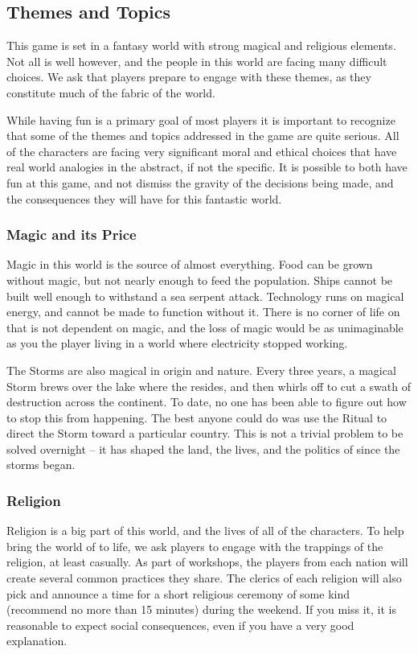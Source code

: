 \documentclass[sheet]{GL2020}
\begin{document}
\subsection{Themes and Topics}
This game is set in a fantasy world with strong magical and religious elements. Not all is well however, and the people in this world are facing many difficult choices. We ask that players prepare to engage with these themes, as they constitute much of the fabric of the world.

While having fun is a primary goal of most players it is important to recognize that some of the themes and topics addressed in the game are quite serious. All of the characters are facing very significant moral and ethical choices that have real world analogies in the abstract, if not the specific. It is possible to both have fun at this game, and not dismiss the gravity of the decisions being made, and the consequences they will have for this fantastic world.

\subsubsection{Magic and its Price}
Magic in this world is the source of almost everything. Food can be grown without magic, but not nearly enough to feed the population. Ships cannot be built well enough to withstand a sea serpent attack. Technology runs on magical energy, and cannot be made to function without it. There is no corner of life on \pEarth{} that is not dependent on magic, and the loss of magic would be as unimaginable as you the player living in a world where electricity stopped working.

The Storms are also magical in origin and nature. Every three years, a magical Storm brews over the lake where the \pSc{} resides, and then whirls off to cut a swath of destruction across the continent. To date, no one has been able to figure out how to stop this from happening. The best anyone could do was use the Ritual to direct the Storm toward a particular country. This is not a trivial problem to be solved overnight -- it has shaped the land, the lives, and the politics of \pEarth{} since the storms began.

\subsubsection{Religion}
Religion is a big part of this world, and the lives of all of the characters. To help bring the world of \pEarth{} to life, we ask players to engage with the trappings of the religion, at least casually. As part of workshops, the players from each nation will create several common practices they share. The clerics of each religion will also pick and announce a time for a short religious ceremony of some kind (recommend no more than 15 minutes) during the weekend. If you miss it, it is reasonable to expect social consequences, even if you have a very good explanation.
\end{document}
